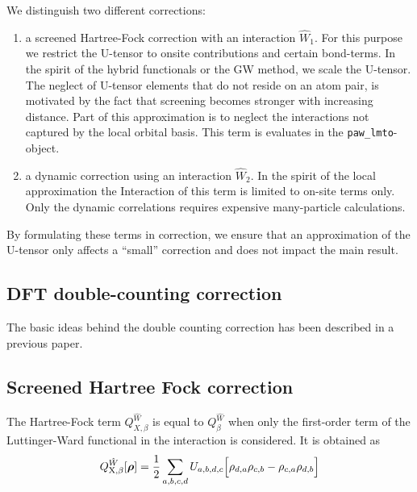 \documentclass[11pt,a4paper]{report}
\begin{document}
We distinguish two different corrections:
\begin{enumerate}
\item a screened Hartree-Fock correction with an interaction
  $\hat{W}_1$. For this purpose we restrict the U-tensor to onsite
  contributions and certain bond-terms. In the spirit of the hybrid
  functionals or the GW method, we scale the U-tensor. The neglect of
  U-tensor elements that do not reside on an atom pair, is motivated
  by the fact that screening becomes stronger with increasing
  distance. Part of this approximation is to neglect the interactions
  not captured by the local orbital basis. This term is evaluates in
  the \verb|paw_lmto|-object.
\item a dynamic correction using an interaction $\hat{W}_2$. In the
  spirit of the local approximation the Interaction of this term is
  limited to on-site terms only. Only the dynamic correlations
  requires expensive many-particle calculations.
\end{enumerate}


By formulating these terms in correction, we ensure
that an approximation of the U-tensor only affects a ``small''
correction and does not impact the main result.


\subsection{DFT double-counting correction}
The basic ideas behind the double counting correction has been
described in a previous paper\cite{bloechl11_prb84_205101}.


\subsection{Screened Hartree Fock correction}
The Hartree-Fock term $Q^{\hat{W}}_{X,\beta}$ is equal to
$Q^{\hat{W}}_\beta$ when only the first-order term of the
Luttinger-Ward functional in the interaction is considered.  It is
obtained as
\begin{eqnarray}
Q_{\text{X},\beta}^{\hat{W}}[\bm{\rho}]
=\frac{1}{2}\sum_{a,b,c,d}U_{a,b,d,c}
\Bigl[\rho_{d,a}\rho_{c,b}-\rho_{c,a}\rho_{d,b}\Bigr]
\end{eqnarray}
\end{document}

